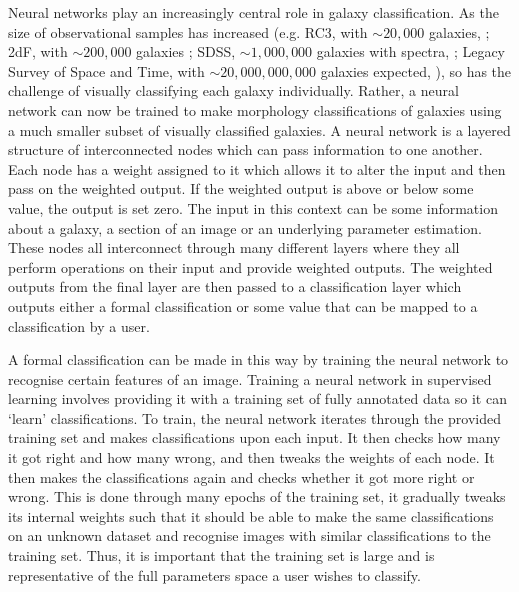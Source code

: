 Neural networks play an increasingly central role in galaxy classification. As the size of observational samples has increased (e.g. RC3, with $\sim 20,000$ galaxies, \citealt{1991rc3..book.....D}; 2dF, with $\sim 200,000$ galaxies \citealt{2001MNRAS.328.1039C}; SDSS, $\sim 1,000,000$ galaxies with spectra, \citealt{2000AJ....120.1579Y, 2009ApJS..182..543A}; Legacy Survey of Space and Time, with $\sim 20,000,000,000$ galaxies expected, \citealt{2019ApJ...873..111I}), so has the challenge of visually classifying each galaxy individually. Rather, a neural network can now be trained to make morphology classifications of galaxies using a much smaller subset of visually classified galaxies. A neural network is a layered structure of interconnected nodes which can pass information to one another. Each node has a weight assigned to it which allows it to alter the input and then pass on the weighted output. If the weighted output is above or below some value, the output is set zero. The input in this context can be some information about a galaxy, a section of an image or an underlying parameter estimation. These nodes all interconnect through many different layers where they all perform operations on their input and provide weighted outputs. The weighted outputs from the final layer are then passed to a classification layer which outputs either a formal classification or some value that can be mapped to a classification by a user.

A formal classification can be made in this way by training the neural network to recognise certain features of an image. Training a neural network in supervised learning involves providing it with a training set of fully annotated data so it can `learn' classifications. To train, the neural network iterates through the provided training set and makes classifications upon each input. It then checks how many it got right and how many wrong, and then tweaks the weights of each node. It then makes the classifications again and checks whether it got more right or wrong. This is done through many epochs of the training set, it gradually tweaks its internal weights such that it should be able to make the same classifications on an unknown dataset and recognise images with similar classifications to the training set. Thus, it is important that the training set is large and is representative of the full parameters space a user wishes to classify.

